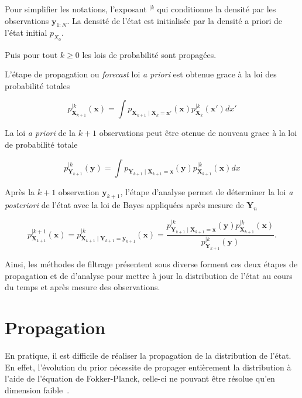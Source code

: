 Pour simplifier les notations, l'exposant $^{\mid k}$ qui conditionne la densité par les observations $\bm y_{1:N}$.
La densité de l'état est initialisée par la densité a priori de l'état initial $p_{X_0}$.

Puis pour tout $k \geq 0$ les lois de probabilité sont propagées.

L'étape de propagation ou \textit{forecast} loi \textit{a priori} est obtenue grace à la loi des probabilité totales

\begin{equation}\label{tot_rule}
    p_{\bm X_{k+1}}^{\mid k}(\bm x)= \int p_{\bm X_{k+1}\mid \bm X_{k} = \bm x'}(\bm x) p_{\bm X_{k}}^{\mid k}(\bm x')dx'
\end{equation}

La loi \textit{a priori} de la $k+1$ observations peut être otenue de nouveau grace à la loi de probabilité totale

\begin{equation*}
    p_{\bm Y_{k+1}}^{\mid k}(\bm y) = \int p_{\bm Y_{k+1}\mid \bm X_{k+1} = \bm x}(\bm y) p_{\bm X_{k+1}}^{\mid k}(\bm x)dx
\end{equation*}

Après la $k+1$ observation $\bm y_{k+1}$, l'étape d'analyse permet de déterminer la loi \textit{a posteriori} de l'état
avec la loi de Bayes appliquées après mesure de $\bm Y_n$

\begin{equation*}
    p_{\bm X_{k+1}}^{\mid k+1}(\bm x) = p_{\bm X_{k+1} \mid \bm Y_{k+1} = \bm y_{k+1}}^{\mid k}(\bm x) = \frac{p_{\bm Y_{k+1} \mid \bm X_{k+1} = \bm x}^{\mid k}(\bm y) p_{\bm X_{k+1}}^{\mid k}(\bm x) }{p_{\bm Y_{k+1}}^{\mid k}(\bm y)}.
\end{equation*}

Ainsi, les méthodes de filtrage présentent sous diverse forment ces deux étapes de propagation et de d'analyse pour mettre à jour la distribution de l'état au cours du temps et après mesure des observations.

\section{Propagation}
En pratique, il est difficile de réaliser la propagation de la distribution de l'état.
En effet, l'évolution du prior nécessite de propager entièrement la distribution à l'aide de l'équation de Fokker-Planck, celle-ci ne pouvant être résolue qu'en dimension faible~\cite{jazwinski_4_1970}.

